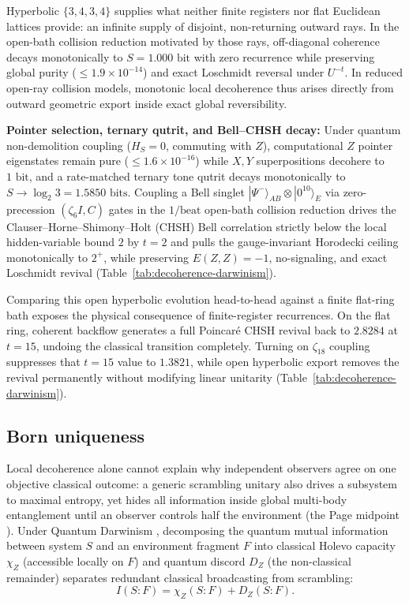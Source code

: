 Hyperbolic $\{3,4,3,4\}$ supplies what neither finite registers nor flat Euclidean lattices provide: an infinite supply
of disjoint, non-returning outward rays. In the open-bath collision reduction motivated by those rays, off-diagonal
coherence decays monotonically to $S = 1.000\text{ bit}$ with zero recurrence while preserving global purity
($\le 1.9 \times 10^{-14}$) and exact Loschmidt reversal under $U^{-t}$. In reduced open-ray collision models,
monotonic local decoherence thus arises directly from outward geometric export inside exact global reversibility.

\textbf{Pointer selection, ternary qutrit, and Bell--CHSH decay:} Under quantum non-demolition coupling ($H_S = 0$,
commuting with $Z$), computational $Z$ pointer eigenstates remain pure ($\le 1.6 \times 10^{-16}$) while $X, Y$
superpositions decohere to $1\text{ bit}$, and a rate-matched ternary tone qutrit decays monotonically to
$S \to \log_2 3 = 1.5850\text{ bits}$. Coupling a Bell singlet $|\Psi^-\rangle_{AB} \otimes |0^{10}\rangle_E$ via
zero-precession $(\zeta_6 I, C)$ gates in the $1/\text{beat}$ open-bath collision reduction \cite{clauser1969,
horodecki1995} drives the Clauser--Horne--Shimony--Holt (CHSH) Bell correlation strictly below the local hidden-variable
bound $2$ by $t = 2$ and pulls the gauge-invariant Horodecki ceiling monotonically to $2^+$, while preserving
$E(Z, Z) = -1$, no-signaling, and exact Loschmidt revival (Table~\ref{tab:decoherence-darwinism}).

Comparing this open hyperbolic evolution head-to-head against a finite flat-ring bath exposes the physical consequence of
finite-register recurrences. On the flat ring, coherent backflow generates a full Poincar\'e CHSH revival back to
$2.8284$ at $t = 15$, undoing the classical transition completely. Turning on $\zeta_{18}$ coupling suppresses that
$t = 15$ value to $1.3821$, while open hyperbolic export removes the revival permanently without modifying linear
unitarity (Table~\ref{tab:decoherence-darwinism}).

\subsection{Born uniqueness}

Local decoherence alone cannot explain why independent observers agree on one objective classical outcome: a generic
scrambling unitary also drives a subsystem to maximal entropy, yet hides all information inside global multi-body
entanglement until an observer controls half the environment (the Page midpoint \cite{page1993}). Under Quantum
Darwinism \cite{zurek2009}, decomposing the quantum mutual information between system $S$ and an environment fragment
$F$ into classical Holevo capacity $\chi_Z$ (accessible locally on $F$) and quantum discord $D_Z$ (the non-classical
remainder) \cite{ollivier2001} separates redundant classical broadcasting from scrambling:
\begin{equation}
I(S : F) = \chi_Z(S : F) + D_Z(S : F).
\label{eq:darwinism-decomp}
\end{equation}

